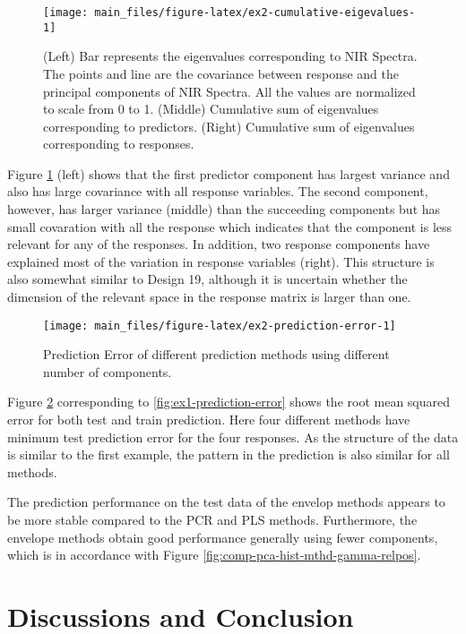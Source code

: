 \documentclass[12pt,3p,authoryear]{elsarticle}
\begin{document}
\begin{figure}
\texttt{[image: main\_files/figure-latex/ex2-cumulative-eigevalues-1]} \caption{(Left) Bar represents the eigenvalues
corresponding to NIR Spectra. The points and line are the covariance
between response and the principal components of NIR Spectra. All the
values are normalized to scale from 0 to 1. (Middle) Cumulative sum of
eigenvalues corresponding to predictors. (Right) Cumulative sum of
eigenvalues corresponding to responses.}\label{fig:ex2-cumulative-eigevalues}
\end{figure}

Figure \ref{fig:ex2-cumulative-eigevalues} (left) shows that the first
predictor component has largest variance and also has large covariance
with all response variables. The second component, however, has larger
variance (middle) than the succeeding components but has small
covaration with all the response which indicates that the component is
less relevant for any of the responses. In addition, two response
components have explained most of the variation in response variables
(right). This structure is also somewhat similar to Design 19, although
it is uncertain whether the dimension of the relevant space in the
response matrix is larger than one.

\begin{figure}[!htb]
\texttt{[image: main\_files/figure-latex/ex2-prediction-error-1]} \caption{Prediction Error of different prediction methods using different number of components.}\label{fig:ex2-prediction-error}
\end{figure}

Figure \ref{fig:ex2-prediction-error} corresponding to
\ref{fig:ex1-prediction-error} shows the root mean squared error for
both test and train prediction. Here four different methods have minimum
test prediction error for the four responses. As the structure of the
data is similar to the first example, the pattern in the prediction is
also similar for all methods.

The prediction performance on the test data of the envelop methods
appears to be more stable compared to the PCR and PLS methods.
Furthermore, the envelope methods obtain good performance generally
using fewer components, which is in accordance with Figure
\ref{fig:comp-pca-hist-mthd-gamma-relpos}.

\section{Discussions and Conclusion}\label{discussions-and-conclusion}
\end{document}
